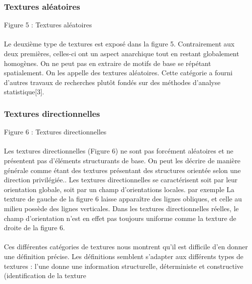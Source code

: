 \documentclass[12pt]{article}
\begin{document}
\subsubsection{Textures aléatoires}

	 		

Figure 5 : Textures aléatoires

\paragraph{}
Le deuxième type de textures est exposé dans la figure 5. Contrairement aux deux premières, celles-ci ont un aspect anarchique tout en restant globalement homogènes. On ne peut pas en extraire de motifs de base se répétant spatialement. On les appelle des textures aléatoires.
Cette catégorie a fourni d’autres travaux de recherches plutôt fondés sur des méthodes
d’analyse statistique[3].

\subsubsection{Textures directionnelles}

              

Figure 6 : Textures directionnelles

\paragraph{}
Les textures directionnelles (Figure 6) ne sont pas forcément aléatoires et ne présentent pas d’éléments structurants de base.
On peut les décrire de manière générale comme étant des textures  présentant des structures orientée selon une direction privilégiée..
Les textures directionnelles se caractérisent soit par leur orientation globale, soit par un champ d’orientations locales. par exemple La texture de gauche de la figure 6 laisse apparaître des lignes obliques, et celle au milieu possède des lignes verticales.
Dans les textures directionnelles réelles, le champ d’orientation n’est en effet pas toujours uniforme comme la texture de droite de la figure 6.

\paragraph{}
Ces différentes catégories de textures nous montrent qu’il est difficile d’en donner une
définition précise. Les définitions semblent s’adapter aux différents types de textures : l’une
donne une information structurelle, déterministe et constructive (identification de la texture
\end{document}
